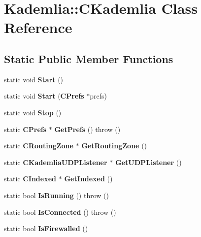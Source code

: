 \section{Kademlia::CKademlia Class Reference}
\label{classKademlia_1_1CKademlia}
\subsection*{Static Public Member Functions}
\begin{DoxyCompactItemize}
\item 
static void {\bfseries Start} ()\label{classKademlia_1_1CKademlia_a827f77e99b8a0490960a002ae5eb19f8}

\item 
static void {\bfseries Start} ({\bf CPrefs} $\ast$prefs)\label{classKademlia_1_1CKademlia_a15e9de1365637d43ed234da0b9e7c801}

\item 
static void {\bfseries Stop} ()\label{classKademlia_1_1CKademlia_ad75fb679d22346b8a93bd7ceee13df8d}

\item 
static {\bf CPrefs} $\ast$ {\bfseries GetPrefs} ()  throw ()\label{classKademlia_1_1CKademlia_aad98fa01988628360395c172c577efd3}

\item 
static {\bf CRoutingZone} $\ast$ {\bfseries GetRoutingZone} ()\label{classKademlia_1_1CKademlia_ac73180443018fe2905b204b05c43ae4a}

\item 
static {\bf CKademliaUDPListener} $\ast$ {\bfseries GetUDPListener} ()\label{classKademlia_1_1CKademlia_a360ce6e0556318855d45dcaa95b3476a}

\item 
static {\bf CIndexed} $\ast$ {\bfseries GetIndexed} ()\label{classKademlia_1_1CKademlia_a9efbeb66faa092c867a1b4a3b5cd6f7e}

\item 
static bool {\bfseries IsRunning} ()  throw ()\label{classKademlia_1_1CKademlia_a6ce56bf42c8ead354f03267e3332fc14}

\item 
static bool {\bfseries IsConnected} ()  throw ()\label{classKademlia_1_1CKademlia_a014fe6b96f79d614a5c26051187bc273}

\item 
static bool {\bfseries IsFirewalled} ()\label{classKademlia_1_1CKademlia_a8c44d5637ba6c11bd0d56bb3d39b7c08}


\end{DoxyCompactItemize}
